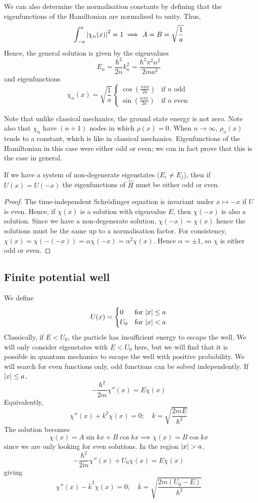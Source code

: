 We can also determine the normalisation constants by defining that the eigenfunctions of the Hamiltonian are normalised to unity.
Thus,
\[
	\int_{-a}^a \abs{\chi_n(x)}^2 = 1 \implies A = B = \sqrt{\frac{1}{a}}
\]
Hence, the general solution is given by the eigenvalues
\[
	E_n = \frac{\hbar^2}{2n} k_n^2 = \frac{\hbar^2 \pi^2 n^2}{2ma^2}
\]
and eigenfunctions
\[
	\chi_n(x) = \sqrt{\frac{1}{a}} \begin{cases}
		\cos(\frac{n \pi x}{2a}) & \text{if } n \text{ odd}  \\
		\sin(\frac{n \pi x}{2a}) & \text{if } n \text{ even}
	\end{cases}
\]
\begin{remark}
	Note that unlike classical mechanics, the ground state energy is not zero.
	Note also that \( \chi_n \) have \( (n+1) \) nodes in which \( \rho(x) = 0 \).
	When \( n \to \infty \), \( \rho_n(x) \) tends to a constant, which is like in classical mechanics.
	Eigenfunctions of the Hamiltonian in this case were either odd or even; we can in fact prove that this is the case in general.
\end{remark}
\begin{proposition}
	If we have a system of non-degenerate eigenstates (\( E_i \neq E_j \)),  then if \( U(x) = U(-x) \) the eigenfunctions of \( \hat H \) must be either odd or even.
\end{proposition}
\begin{proof}
	The time-independent Schr\"odinger equation is invariant under \( x \mapsto -x \) if \( U \) is even.
	Hence, if \( \chi(x) \) is a solution with eigenvalue \( E \), then \( \chi(-x) \) is also a solution.
	Since we have a non-degenerate solution, \( \chi(-x) = \chi(x) \) hence the solutions must be the same up to a normalisation factor.
	For consistency, \( \chi(x) = \chi(-(-x)) = \alpha \chi(-x) = \alpha^2 \chi(x) \).
	Hence \( \alpha = \pm 1 \), so \( \chi \) is either odd or even.
\end{proof}

\subsection{Finite potential well}
We define
\[
	U(x) = \begin{cases}
		0   & \text{for } \abs{x} \leq a \\
		U_0 & \text{for } \abs{x} < a
	\end{cases}
\]
Classically, if \( E < U_0 \), the particle has insufficient energy to escape the well.
We will only consider eigenstates with \( E < U_0 \) here, but we will find that it is possible in quantum mechanics to escape the well with positive probability.
We will search for even functions only, odd functions can be solved independently.
If \( \abs{x} \leq a \),
\[
	-\frac{\hbar^2}{2m} \chi''(x) = E\chi(x)
\]
Equivalently,
\[
	\chi''(x) + k^2 \chi(x) = 0;\quad k = \sqrt{\frac{2mE}{\hbar^2}}
\]
The solution becomes
\[
	\chi(x) = A \sin kx + B \cos kx \implies \chi(x) = B \cos kx
\]
since we are only looking for even solutions.
In the region \( \abs{x} > a \),
\[
	-\frac{\hbar^2}{2m} \chi''(x) + U_0 \chi(x) = E \chi(x)
\]
giving
\[
	\chi''(x) - \overline k^2 \chi(x) = 0;\quad \overline k = \sqrt{\frac{2m(U_0 - E)}{\hbar^2}}
\]
